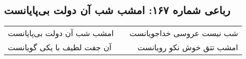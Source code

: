 \begin{center}
\section*{رباعی شماره ۱۶۷: امشب شب آن دولت بی‌پایانست}
\label{sec:0167}
\begin{longtable}{l p{0.5cm} r}
امشب شب آن دولت بی‌پایانست
&&
شب نیست عروسی خداجویانست
\\
آن جفت لطیف با یکی گویانست
&&
امشب تتق خوش نکو رویانست
\\
\end{longtable}
\end{center}
